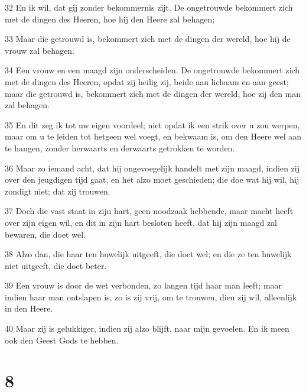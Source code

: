 \par 32 En ik wil, dat gij zonder bekommernis zijt. De ongetrouwde bekommert zich met de dingen des Heeren, hoe hij den Heere zal behagen;
\par 33 Maar die getrouwd is, bekommert zich met de dingen der wereld, hoe hij de vrouw zal behagen.
\par 34 Een vrouw en een maagd zijn onderscheiden. De ongetrouwde bekommert zich met de dingen des Heeren, opdat zij heilig zij, beide aan lichaam en aan geest; maar die getrouwd is, bekommert zich met de dingen der wereld, hoe zij den man zal behagen.
\par 35 En dit zeg ik tot uw eigen voordeel; niet opdat ik een strik over u zou werpen, maar om u te leiden tot hetgeen wel voegt, en bekwaam is, om den Heere wel aan te hangen, zonder herwaarts en derwaarts getrokken te worden.
\par 36 Maar zo iemand acht, dat hij ongevoegelijk handelt met zijn maagd, indien zij over den jeugdigen tijd gaat, en het alzo moet geschieden; die doe wat hij wil, hij zondigt niet; dat zij trouwen.
\par 37 Doch die vast staat in zijn hart, geen noodzaak hebbende, maar macht heeft over zijn eigen wil, en dit in zijn hart besloten heeft, dat hij zijn maagd zal bewaren, die doet wel.
\par 38 Alzo dan, die haar ten huwelijk uitgeeft, die doet wel; en die ze ten huwelijk niet uitgeeft, die doet beter.
\par 39 Een vrouw is door de wet verbonden, zo langen tijd haar man leeft; maar indien haar man ontslapen is, zo is zij vrij, om te trouwen, dien zij wil, alleenlijk in den Heere.
\par 40 Maar zij is gelukkiger, indien zij alzo blijft, naar mijn gevoelen. En ik meen ook den Geest Gods te hebben.

\chapter{8}

